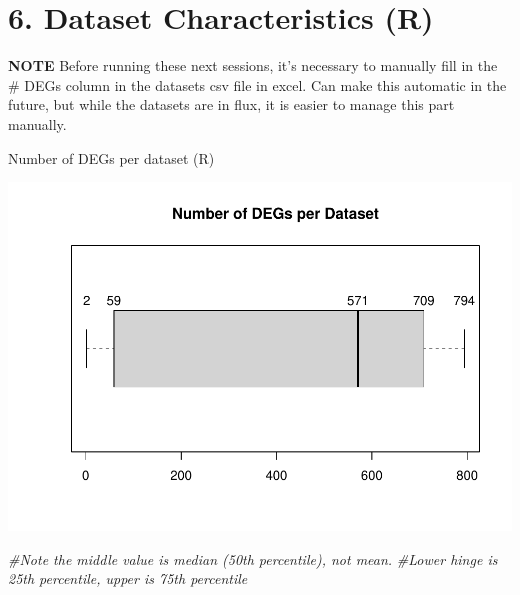 \documentclass[
]{article}
\newenvironment{Shaded}{\begin{snugshade}}{\end{snugshade}}
\newcommand{\CommentTok}[1]{\textcolor[rgb]{0.56,0.35,0.01}{\textit{#1}}}
\newcommand{\DataTypeTok}[1]{\textcolor[rgb]{0.13,0.29,0.53}{#1}}
\newcommand{\FloatTok}[1]{\textcolor[rgb]{0.00,0.00,0.81}{#1}}
\newcommand{\KeywordTok}[1]{\textcolor[rgb]{0.13,0.29,0.53}{\textbf{#1}}}
\newcommand{\NormalTok}[1]{#1}
\newcommand{\OperatorTok}[1]{\textcolor[rgb]{0.81,0.36,0.00}{\textbf{#1}}}
\newcommand{\OtherTok}[1]{\textcolor[rgb]{0.56,0.35,0.01}{#1}}
\newcommand{\StringTok}[1]{\textcolor[rgb]{0.31,0.60,0.02}{#1}}
\begin{document}
\hypertarget{dataset-characteristics-r}{%
\section{6. Dataset Characteristics
(R)}\label{dataset-characteristics-r}}

\textbf{NOTE} Before running these next sessions, it's necessary to
manually fill in the \# DEGs column in the datasets csv file in excel.
Can make this automatic in the future, but while the datasets are in
flux, it is easier to manage this part manually.

Number of DEGs per dataset (R)

\begin{Shaded}
\end{Shaded}

\includegraphics{Thesis_DualCodeTest_files/figure-latex/unnamed-chunk-35-1.pdf}

\begin{Shaded}
\begin{Highlighting}[]
\CommentTok{#Note the middle value is median (50th percentile), not mean.}
\CommentTok{#Lower hinge is 25th percentile, upper is 75th percentile}
\end{Highlighting}
\end{Shaded}
\end{document}
